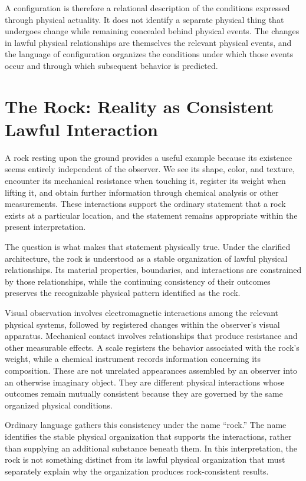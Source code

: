 \documentclass[12pt,onecolumn]{article}
\begin{document}
A configuration is therefore a relational description of the conditions expressed through physical actuality. It does not identify a separate physical thing that undergoes change while remaining concealed behind physical events. The changes in lawful physical relationships are themselves the relevant physical events, and the language of configuration organizes the conditions under which those events occur and through which subsequent behavior is predicted.

\section{The Rock: Reality as Consistent Lawful Interaction}

A rock resting upon the ground provides a useful example because its existence seems entirely independent of the observer. We see its shape, color, and texture, encounter its mechanical resistance when touching it, register its weight when lifting it, and obtain further information through chemical analysis or other measurements. These interactions support the ordinary statement that a rock exists at a particular location, and the statement remains appropriate within the present interpretation.

The question is what makes that statement physically true. Under the clarified architecture, the rock is understood as a stable organization of lawful physical relationships. Its material properties, boundaries, and interactions are constrained by those relationships, while the continuing consistency of their outcomes preserves the recognizable physical pattern identified as the rock.

Visual observation involves electromagnetic interactions among the relevant physical systems, followed by registered changes within the observer's visual apparatus. Mechanical contact involves relationships that produce resistance and other measurable effects. A scale registers the behavior associated with the rock's weight, while a chemical instrument records information concerning its composition. These are not unrelated appearances assembled by an observer into an otherwise imaginary object. They are different physical interactions whose outcomes remain mutually consistent because they are governed by the same organized physical conditions.

Ordinary language gathers this consistency under the name ``rock.'' The name identifies the stable physical organization that supports the interactions, rather than supplying an additional substance beneath them. In this interpretation, the rock is not something distinct from its lawful physical organization that must separately explain why the organization produces rock-consistent results.
\end{document}
